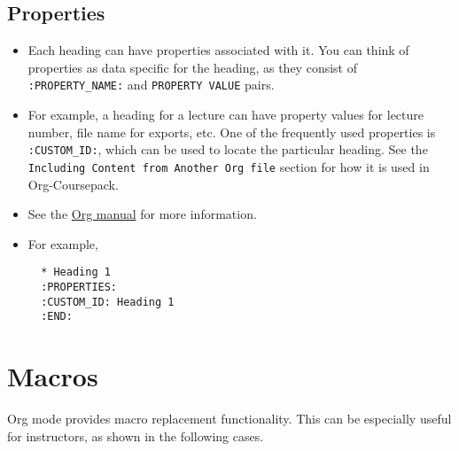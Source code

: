 \documentclass[10pt,article]{article}
\begin{document}
\subsection{Properties}
\label{sec:orgacf5440}
\begin{itemize}
\item Each heading can have properties associated with it. You can think of
properties as data specific for the heading, as they consist of
\texttt{:PROPERTY\_NAME:} and \texttt{PROPERTY VALUE} pairs.
\item For example, a heading for a lecture can have property values for lecture
number, file name for exports, etc. One of the frequently used properties is
\texttt{:CUSTOM\_ID:}, which can be used to locate the particular heading. See the
\texttt{Including Content from Another Org file} section for how it is used in
Org-Coursepack.
\item See the \href{https://orgmode.org/manual/Properties-and-columns.html}{Org manual} for more information.

\item For example,
\begin{verbatim}
  * Heading 1
  :PROPERTIES:
  :CUSTOM_ID: Heading 1
  :END:
\end{verbatim}
\end{itemize}
\section{Macros}
\label{sec:orge1f0fd8}
Org mode provides macro replacement functionality. This can be especially
useful for instructors, as shown in the following cases.
\end{document}
